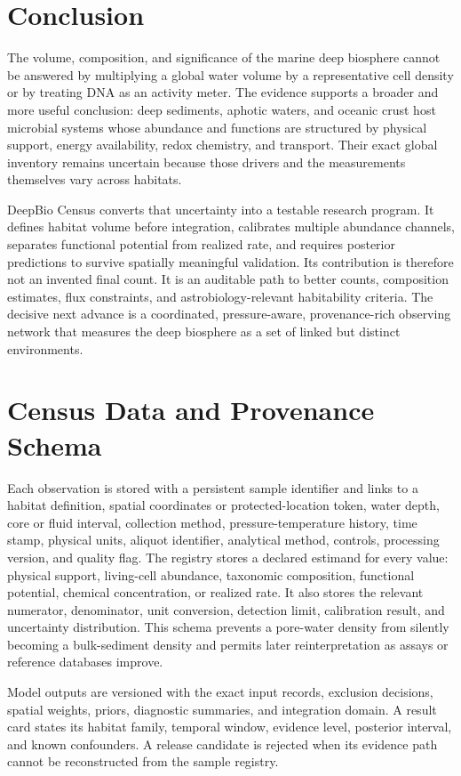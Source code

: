 \documentclass[conference]{../../../../Conference-LaTeX-template_10-17-19/IEEEtran}
\begin{document}
\section{Conclusion}
The volume, composition, and significance of the marine deep biosphere cannot be answered by multiplying a global water volume by a representative cell density or by treating DNA as an activity meter. The evidence supports a broader and more useful conclusion: deep sediments, aphotic waters, and oceanic crust host microbial systems whose abundance and functions are structured by physical support, energy availability, redox chemistry, and transport. Their exact global inventory remains uncertain because those drivers and the measurements themselves vary across habitats.

DeepBio Census converts that uncertainty into a testable research program. It defines habitat volume before integration, calibrates multiple abundance channels, separates functional potential from realized rate, and requires posterior predictions to survive spatially meaningful validation. Its contribution is therefore not an invented final count. It is an auditable path to better counts, composition estimates, flux constraints, and astrobiology-relevant habitability criteria. The decisive next advance is a coordinated, pressure-aware, provenance-rich observing network that measures the deep biosphere as a set of linked but distinct environments.

\appendices
\section{Census Data and Provenance Schema}
Each observation is stored with a persistent sample identifier and links to a habitat definition, spatial coordinates or protected-location token, water depth, core or fluid interval, collection method, pressure-temperature history, time stamp, physical units, aliquot identifier, analytical method, controls, processing version, and quality flag. The registry stores a declared estimand for every value: physical support, living-cell abundance, taxonomic composition, functional potential, chemical concentration, or realized rate. It also stores the relevant numerator, denominator, unit conversion, detection limit, calibration result, and uncertainty distribution. This schema prevents a pore-water density from silently becoming a bulk-sediment density and permits later reinterpretation as assays or reference databases improve.

Model outputs are versioned with the exact input records, exclusion decisions, spatial weights, priors, diagnostic summaries, and integration domain. A result card states its habitat family, temporal window, evidence level, posterior interval, and known confounders. A release candidate is rejected when its evidence path cannot be reconstructed from the sample registry.
\end{document}
